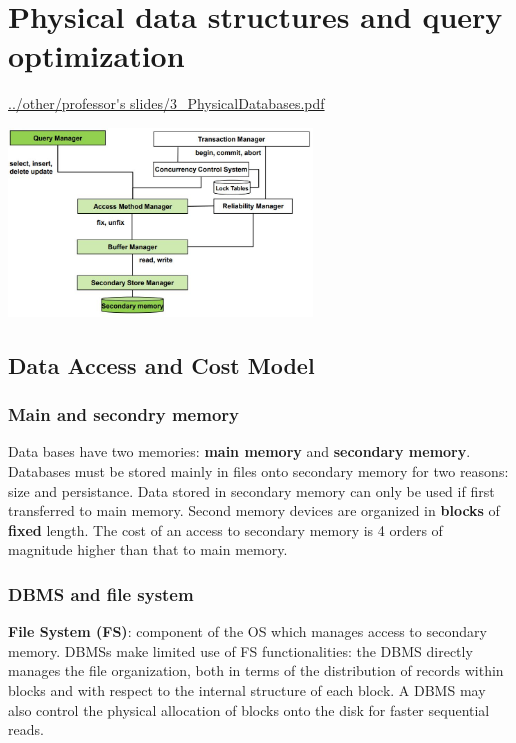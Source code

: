 \section{Physical data structures
and query optimization}
\url{../other/professor's slides/3_PhysicalDatabases.pdf}
\begin{center}
    \includegraphics[height=5cm]{../arguments/Querymanagement.JPG}
\end{center}
\subsection{Data Access and Cost Model}
\subsubsection{Main and secondry memory}
Data bases have two memories: \textbf{main memory} and \textbf{secondary memory}.\newline
\newline
Databases must be stored mainly in files onto secondary memory for two reasons: size and persistance.\newline
\newline
Data stored in secondary memory can only be used if first transferred to main memory.\newline
\newline
Second memory devices are organized in \textbf{blocks} of \textbf{fixed} length.\newline
\newline
The cost of an access to secondary memory is 4 orders of magnitude higher than that to main memory.
\subsubsection{DBMS and file system}
\textbf{File System (FS)}: component of the OS which manages access to secondary memory.\newline
\newline
DBMSs make limited use of FS functionalities: the DBMS directly manages the file organization, both in terms of the distribution of records within blocks and with respect to the internal structure of each block. A DBMS may also control the physical allocation of blocks onto the disk for faster sequential reads.
